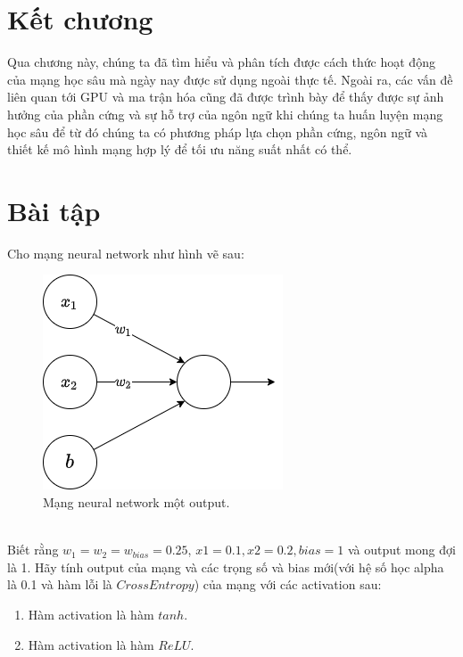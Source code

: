 \section{Kết chương}
 Qua chương này, chúng ta đã tìm hiểu và phân tích được cách thức hoạt động của mạng học sâu mà ngày nay được sử dụng ngoài thực tế. Ngoài ra, các vấn đề liên quan tới GPU và ma trận hóa cũng đã được trình bày để thấy được sự ảnh hưởng của phần cứng và sự hỗ trợ của ngôn ngữ khi chúng ta huấn luyện mạng học sâu để từ đó chúng ta có phương pháp lựa chọn phần cứng, ngôn ngữ và thiết kế mô hình mạng hợp lý để tối ưu năng suất nhất có thể.

\newpage
\section{Bài tập}
\begin{exer}
Cho mạng neural network như hình vẽ sau:
\begin{figure}[!h]
	\centering
		\includegraphics[width=0.5\columnwidth]{books/artificial-neural-network/chapter03/figure/bai1.png}
        \caption{Mạng neural network một output.}
		\centering
\end{figure}\\
Biết rằng $w_{1} = w_{2} = w_{bias} = 0.25$, $x1=0.1, x2=0.2, bias= 1$ và output mong đợi là 1. Hãy tính output của mạng và các trọng số và bias mới(với hệ số học alpha là 0.1 và hàm lỗi là $CrossEntropy$) của mạng với các activation sau:
\begin{enumerate}
    \item Hàm activation là hàm $tanh$.
    \item Hàm activation là hàm $ReLU$.
\end{enumerate}
\end{exer}

